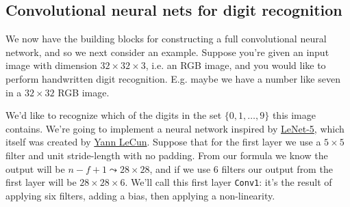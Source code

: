 \documentclass[12pt]{article}
\begin{document}
\subsection{Convolutional neural nets for digit recognition} 
We now have the building blocks for constructing a full convolutional neural network, and so we next
consider an example. Suppose you're given an input image with dimension $32 \times 32 \times 3$, i.e. an RGB image, and you would
like to perform handwritten digit recognition. E.g. maybe we have a number like seven in a $32 \times 32$ RGB image.
\begin{figure}[h]   \centering
   \end{figure}
We'd like to recognize which of the digits in the set $\{0, 1, \ldots, 9\}$ this image contains. We're going to implement a neural
network inspired by \href{http://yann.lecun.com/exdb/lenet/}{LeNet-5}, which itself was created by 
\href{http://yann.lecun.com/}{Yann LeCun}. Suppose that for the first layer we use a $5 \times 5$ filter and unit stride-length
with no padding. From our formula we know the output will be $n-f+1 \leadsto 28 \times 28$, and if we use 6 filters our output from
the first layer will be $28 \times 28 \times 6$. We'll call this first layer \texttt{Conv1}: it's the result of applying six filters, adding a bias, then applying a non-linearity.
\end{document}
